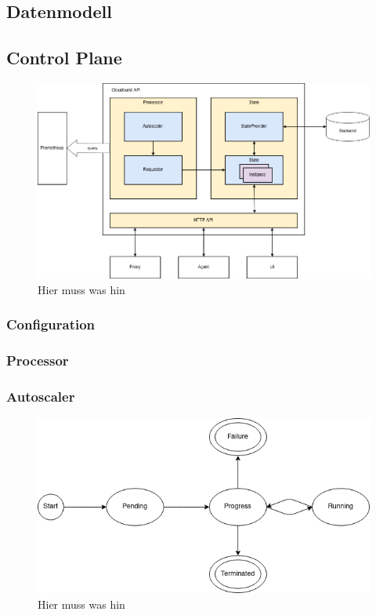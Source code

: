 \documentclass[runningheads]{llncs}
\begin{document}
\subsection{Datenmodell}
	
\subsection{Control Plane}
	
\begin{figure}[h]
	\centering
	\includegraphics[width=1.0\linewidth,scale=1.0]{images/autoscaler.png}
	\caption{Hier muss was hin}
\end{figure}

\subsubsection{Configuration}
	
\subsubsection{Processor}
	
\subsubsection{Autoscaler}

\begin{figure}[h]
	\centering
	\includegraphics[width=0.8\linewidth,scale=0.8]{images/state.png}
	\caption{Hier muss was hin}
\end{figure}
	
\end{document}
